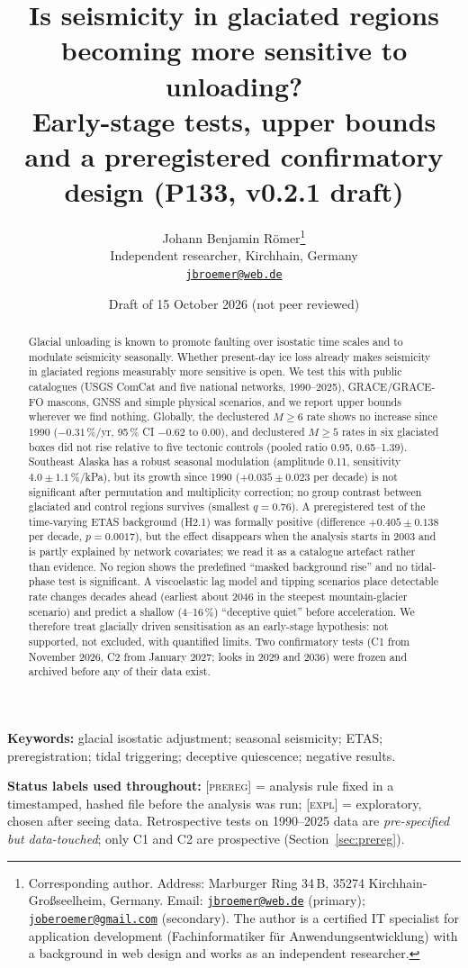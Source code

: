 \documentclass[11pt,a4paper]{article}
\title{Is seismicity in glaciated regions becoming more sensitive to unloading?\\
\large Early-stage tests, upper bounds and a preregistered confirmatory design (P133, v0.2.1 draft)}
\author{Johann Benjamin Römer\thanks{Corresponding author. Address: Marburger Ring 34\,B, 35274 Kirchhain-Gro{\ss}seelheim, Germany. Email: \href{mailto:jbroemer@web.de}{\texttt{jbroemer@web.de}} (primary); \href{mailto:joberoemer@gmail.com}{\texttt{joberoemer@gmail.com}} (secondary). The author is a certified IT specialist for application development (Fachinformatiker f\"ur Anwendungsentwicklung) with a background in web design and works as an independent researcher.}\\[2pt]
\small Independent researcher, Kirchhain, Germany\\
\small \href{mailto:jbroemer@web.de}{\texttt{jbroemer@web.de}}}
\date{Draft of 15 October 2026 (not peer reviewed)}
\newcommand{\pre}{\textnormal{\textsc{[prereg]}}}
\newcommand{\expl}{\textnormal{\textsc{[expl]}}}
\begin{document}
\maketitle

\begin{abstract}
\noindent
Glacial unloading is known to promote faulting over isostatic time scales and to modulate seismicity seasonally. Whether present-day ice loss already makes seismicity in glaciated regions measurably more sensitive is open. We test this with public catalogues (USGS ComCat and five national networks, 1990--2025), GRACE/GRACE-FO mascons, GNSS and simple physical scenarios, and we report upper bounds wherever we find nothing. Globally, the declustered $M\geq6$ rate shows no increase since 1990 ($-0.31$\,\%/yr, 95\,\% CI $-0.62$ to $0.00$), and declustered $M\geq5$ rates in six glaciated boxes did not rise relative to five tectonic controls (pooled ratio 0.95, 0.65--1.39). Southeast Alaska has a robust seasonal modulation (amplitude 0.11, sensitivity $4.0\pm1.1$\,\%/kPa), but its growth since 1990 ($+0.035\pm0.023$ per decade) is not significant after permutation and multiplicity correction; no group contrast between glaciated and control regions survives (smallest $q=0.76$). A preregistered test of the time-varying ETAS background (H2.1) was formally positive (difference $+0.405\pm0.138$ per decade, $p=0.0017$), but the effect disappears when the analysis starts in 2003 and is partly explained by network covariates; we read it as a catalogue artefact rather than evidence. No region shows the predefined ``masked background rise'' and no tidal-phase test is significant. A viscoelastic lag model and tipping scenarios place detectable rate changes decades ahead (earliest about 2046 in the steepest mountain-glacier scenario) and predict a shallow (4--16\,\%) ``deceptive quiet'' before acceleration. We therefore treat glacially driven sensitisation as an early-stage hypothesis: not supported, not excluded, with quantified limits. Two confirmatory tests (C1 from November 2026, C2 from January 2027; looks in 2029 and 2036) were frozen and archived before any of their data exist.
\end{abstract}

\noindent\textbf{Keywords:} glacial isostatic adjustment; seasonal seismicity; ETAS; preregistration; tidal triggering; deceptive quiescence; negative results.

\noindent\textbf{Status labels used throughout:} \pre{} = analysis rule fixed in a timestamped, hashed file before the analysis was run; \expl{} = exploratory, chosen after seeing data. Retrospective tests on 1990--2025 data are \emph{pre-specified but data-touched}; only C1 and C2 are prospective (Section~\ref{sec:prereg}).
\end{document}
